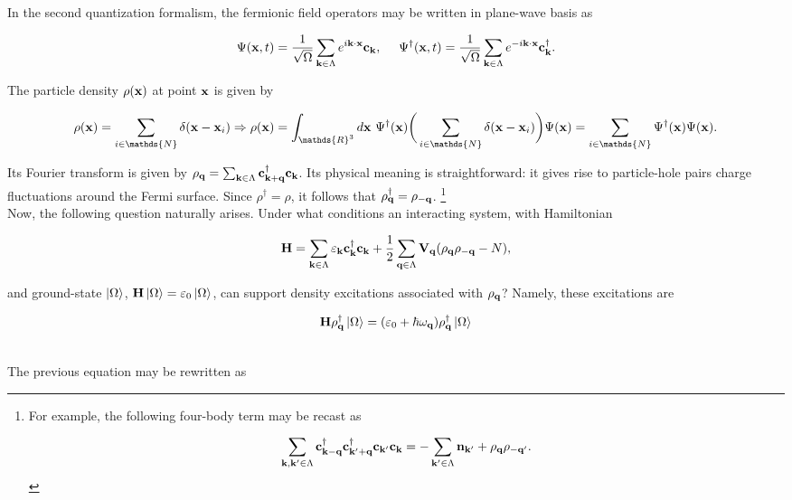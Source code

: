 \documentclass{homework}
\begin{document}
In the second quantization formalism, the fermionic field operators may be written in plane-wave basis as 

$$
    \Psi({\bf x}, t) = \frac{1}{\sqrt{\Omega}} \sum_{{\bf k} \in \Lambda} e^{i {\bf k} \cdot {{\bf x}}} {\bf c}_{{\bf k}}, \textnormal{ } \textnormal{ } \textnormal{ } \textnormal{ } 
    \Psi^\dagger({\bf x}, t) = \frac{1}{\sqrt{\Omega}} \sum_{{\bf k} \in \Lambda} e^{-i {\bf k} \cdot {{\bf x}}} {\bf c}_{{\bf k}}^\dagger.
$$

The particle density $\rho({\bf x})$ at point ${\bf x}$ is given by 

$$
    \rho({\bf x}) = \sum_{i \in \mathds{N}} \delta({\bf x} - {\bf x}_i) \Rightarrow \rho({\bf x}) = \int_{\mathds{R}^3} d{\bf x} \blanky \Psi^\dagger({\bf x}) \bigg(\sum_{i \in \mathds{N}} \delta({\bf x} - {\bf x}_i)\bigg) \Psi({\bf x}) = \sum_{i \in \mathds{N} }\Psi^\dagger({\bf x}) \Psi({\bf x}). 
$$

Its Fourier transform is given by ${\rho_{{\bf q}}} = \sum_{{\bf k} \in \Lambda} {\bf c}_{{\bf k}+{\bf q}}^\dagger {\bf c}_{\bf k}$. Its physical meaning is straightforward: it gives rise to particle-hole pairs charge fluctuations around the Fermi surface. Since $\rho^\dagger = \rho$, it follows that $\rho_{{\bf q}}^\dagger = \rho_{-{\bf q}}$. \footnote{For example, the following four-body term may be recast as 

$$
\sum_{{\bf k, k'} \in \Lambda} {\bf c}_{{\bf k}-{\bf q}}^\dagger {\bf c}_{{\bf k}'+{\bf q}}^\dagger {\bf c}_{{\bf k}'} {\bf c}_{{\bf k}} = - \sum_{{\bf k'} \in \Lambda} {\bf n}_{{\bf k}'} + \rho_{{\bf q}} \rho_{-{\bf q}'}.
$$}\\

Now, the following question naturally arises. Under what conditions an interacting system, with Hamiltonian 

$$
    {\bf H} = \sum_{{\bf k} \in \Lambda} \varepsilon_{{\bf k}} {\bf c}_{{\bf k}}^\dagger {\bf c}_{{\bf k}} + \frac{1}{2} \sum_{{\bf q} \in \Lambda} {\bf V}_{{\bf q}} (\rho_{{\bf q}} \rho_{-{\bf q}} - N),
$$

and ground-state $\ket{\Omega}$, ${\bf H} \ket{\Omega} = \varepsilon_0 \ket{\Omega}$, can support density excitations associated with $\rho_{{\bf q}}$? Namely, these excitations are

$$
    {\bf H} \rho_{{\bf q}}^\dagger \ket{\Omega} = (\varepsilon_0 + \hbar \omega_{{\bf q}}) \rho_{{\bf q}}^\dagger \ket{\Omega}
$$

\blanky \\

The previous equation may be rewritten as 
\end{document}
